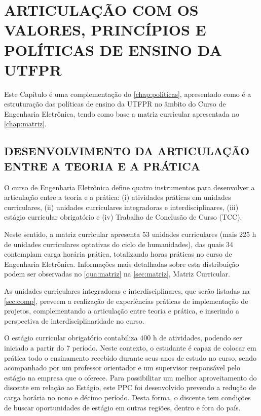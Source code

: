 \chapter{ARTICULAÇÃO COM OS VALORES, PRINCÍPIOS E POLÍTICAS DE ENSINO DA UTFPR}

Este Capítulo é uma complementação do \autoref{chap:politicas}, apresentado como é a estruturação das políticas de ensino da UTFPR no âmbito do Curso de Engenharia Eletrônica, tendo como base a matriz curricular apresentada no \autoref{chap:matriz}.

\section{DESENVOLVIMENTO DA ARTICULAÇÃO ENTRE A TEORIA E A PRÁTICA}

O curso de Engenharia Eletrônica define quatro instrumentos para desenvolver a articulação entre a teoria e a prática: (i) atividades práticas em unidades curriculares, (ii) unidades curriculares integradoras e interdisciplinares, (iii) estágio curricular obrigatório e (iv) Trabalho de Conclusão de Curso (TCC).

Neste sentido, a matriz curricular apresenta 53 unidades curriculares (mais 225 h de unidades curriculares optativas do ciclo de humanidades), das quais 34 contemplam carga horária prática, totalizando \the\value{horasAP} horas práticas no curso de Engenharia Eletrônica. Informações mais detalhadas sobre esta distribuição podem ser observadas no \autoref{qua:matriz} na \autoref{sec:matriz}, Matriz Curricular.

As unidades curriculares integradoras e interdisciplinares, que serão listadas na \autoref{sec:comp}, preveem a realização de experiências práticas de implementação de projetos, complementando a articulação entre teoria e prática, e inserindo a perspectiva de interdisciplinaridade no curso.

O estágio curricular obrigatório contabiliza 400 h de atividades, podendo ser iniciado a partir do 7\textordmasculine{} período. Neste contexto, o estudante é capaz de colocar em prática todo o ensinamento recebido durante seus anos de estudo no curso, sendo acompanhado por um professor orientador e um supervisor responsável pelo estágio na empresa que o oferece. Para possibilitar um melhor aproveitamento do discente em relação ao Estágio, este PPC foi desenvolvido prevendo a redução de carga horária no nono e décimo período. Desta forma, o discente tem condições de buscar oportunidades de estágio em outras regiões, dentro e fora do país.

